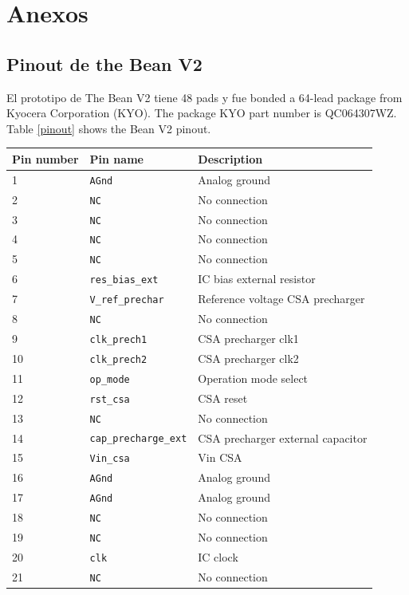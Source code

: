 \chapter{Anexos}
\section{Pinout de the Bean V2}
 \label{appendix1}
El prototipo de The Bean V2 tiene 48 pads y fue bonded a 64-lead package from \mbox{Kyocera} Corporation (KYO). The package KYO part number is QC064307WZ. Table \ref{pinout} shows the Bean V2 pinout.


\begin{center}
\begin{longtable}{|l|l|l|}\hline
{\bf Pin number} & {\bf Pin name} & {\bf Description} \\ \hline\hline
1 & \verb=AGnd= & Analog ground \\\hline
2 & \verb=NC= & No connection \\\hline
3 & \verb=NC= & No connection \\\hline
4 & \verb=NC= & No connection \\\hline
5 & \verb=NC= & No connection \\\hline
6 & \verb=res_bias_ext= & IC bias external resistor \\\hline
7 & \verb=V_ref_prechar= & Reference voltage CSA precharger \\\hline
8 & \verb=NC= & No connection  \\\hline
9 &  \verb=clk_prech1= & CSA precharger clk1  \\\hline
10 & \verb=clk_prech2= & CSA precharger clk2  \\\hline
11 & \verb=op_mode= & Operation mode select \\\hline
12 & \verb=rst_csa= & CSA reset  \\\hline
13 & \verb=NC= & No connection \\\hline
14 & \verb=cap_precharge_ext= & CSA precharger external capacitor \\\hline
15 & \verb=Vin_csa= & Vin CSA \\\hline
16 & \verb=AGnd= & Analog ground \\\hline
17 & \verb=AGnd= & Analog ground \\\hline
18 & \verb=NC= & No connection \\\hline
19 & \verb=NC= & No connection \\\hline
20 & \verb=clk= & IC clock \\\hline
21 & \verb=NC= & No connection \\\hline

\end{longtable}
\end{center}
